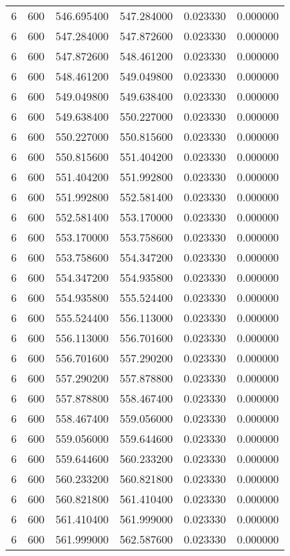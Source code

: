 \begin{longtable}{rrrrrr}
6 & 600 & 546.695400 & 547.284000 & 0.023330 & 0.000000 \\
6 & 600 & 547.284000 & 547.872600 & 0.023330 & 0.000000 \\
6 & 600 & 547.872600 & 548.461200 & 0.023330 & 0.000000 \\
6 & 600 & 548.461200 & 549.049800 & 0.023330 & 0.000000 \\
6 & 600 & 549.049800 & 549.638400 & 0.023330 & 0.000000 \\
6 & 600 & 549.638400 & 550.227000 & 0.023330 & 0.000000 \\
6 & 600 & 550.227000 & 550.815600 & 0.023330 & 0.000000 \\
6 & 600 & 550.815600 & 551.404200 & 0.023330 & 0.000000 \\
6 & 600 & 551.404200 & 551.992800 & 0.023330 & 0.000000 \\
6 & 600 & 551.992800 & 552.581400 & 0.023330 & 0.000000 \\
6 & 600 & 552.581400 & 553.170000 & 0.023330 & 0.000000 \\
6 & 600 & 553.170000 & 553.758600 & 0.023330 & 0.000000 \\
6 & 600 & 553.758600 & 554.347200 & 0.023330 & 0.000000 \\
6 & 600 & 554.347200 & 554.935800 & 0.023330 & 0.000000 \\
6 & 600 & 554.935800 & 555.524400 & 0.023330 & 0.000000 \\
6 & 600 & 555.524400 & 556.113000 & 0.023330 & 0.000000 \\
6 & 600 & 556.113000 & 556.701600 & 0.023330 & 0.000000 \\
6 & 600 & 556.701600 & 557.290200 & 0.023330 & 0.000000 \\
6 & 600 & 557.290200 & 557.878800 & 0.023330 & 0.000000 \\
6 & 600 & 557.878800 & 558.467400 & 0.023330 & 0.000000 \\
6 & 600 & 558.467400 & 559.056000 & 0.023330 & 0.000000 \\
6 & 600 & 559.056000 & 559.644600 & 0.023330 & 0.000000 \\
6 & 600 & 559.644600 & 560.233200 & 0.023330 & 0.000000 \\
6 & 600 & 560.233200 & 560.821800 & 0.023330 & 0.000000 \\
6 & 600 & 560.821800 & 561.410400 & 0.023330 & 0.000000 \\
6 & 600 & 561.410400 & 561.999000 & 0.023330 & 0.000000 \\
6 & 600 & 561.999000 & 562.587600 & 0.023330 & 0.000000 \\

\end{longtable}

